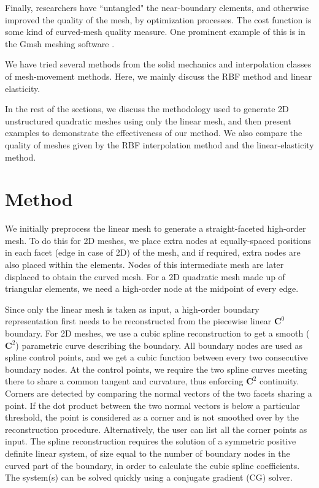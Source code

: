 Finally, researchers have ``untangled" the near-boundary elements, and otherwise improved the quality of the mesh, by optimization processes. The cost function is some kind of curved-mesh quality measure. One prominent example of this is in the Gmsh meshing software \cite{gmsh:untangling}.

We have tried several methods from the solid mechanics and interpolation classes of mesh-movement methods. Here, we mainly discuss the RBF method and linear elasticity.

In the rest of the sections, we discuss the methodology used to generate 2D unstructured quadratic meshes using only the linear mesh, and then present examples to demonstrate the effectiveness of our method. We also compare the quality of meshes given by the RBF interpolation method and the linear-elasticity method.

\section{Method}

We initially preprocess the linear mesh to generate a straight-faceted high-order mesh. To do this for 2D meshes, we place extra nodes at equally-spaced positions in each facet (edge in case of 2D) of the mesh, and if required, extra nodes are also placed within the elements. Nodes of this intermediate mesh are later displaced to obtain the curved mesh. For a 2D quadratic mesh made up of triangular elements, we need a high-order node at the midpoint of every edge.

Since only the linear mesh is taken as input, a high-order boundary representation first needs to be reconstructed from the piecewise linear $\mathbf{C}^0$ boundary. For 2D meshes, we use a cubic spline reconstruction to get a smooth ($\mathbf{C}^2$) parametric curve describing the boundary. All boundary nodes are used as spline control points, and we get a cubic function between every two consecutive boundary nodes. At the control points, we require the two spline curves meeting there to share a common tangent and curvature, thus enforcing $\mathbf{C}^2$ continuity. Corners are detected by comparing the normal vectors of the two facets sharing a point. If the dot product between the two normal vectors is below a particular threshold, the point is considered as a corner and is not smoothed over by the reconstruction procedure. Alternatively, the user can list all the corner points as input. The spline reconstruction requires the solution of a symmetric positive definite linear system, of size equal to the number of boundary nodes in the curved part of the boundary, in order to calculate the cubic spline coefficients. The system(s) can be solved quickly using a conjugate gradient (CG) solver.

